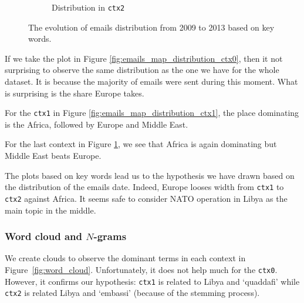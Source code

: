 \documentclass[11pt]{article}
\begin{document}
\begin{figure}[!t]
\begin{subfigure}[b]{0.3\linewidth}
		\caption[]%
		{{\small Distribution in \texttt{ctx2}}}
		\label{fig:emails_map_distribution_ctx2}
	\end{subfigure}
	\caption{The evolution of emails distribution from 2009 to 2013 based on key words.}
	\label{fig:map_distribution_evolution}
\end{figure}

If we take the plot in Figure \ref{fig:emails_map_distribution_ctx0}, then it not surprising to observe the same distribution as the one we have for the whole dataset. It is because the majority of emails were sent during this moment. What is surprising is the share Europe takes.

For the \texttt{ctx1} in Figure \ref{fig:emails_map_distribution_ctx1}, the place dominating is the Africa, followed by Europe and Middle East.

For the last context in Figure \ref{fig:emails_map_distribution_ctx2}, we see that Africa is again dominating but Middle East beats Europe.

The plots based on key words lead us to the hypothesis we have drawn based on the distribution of the emails date. Indeed, Europe looses width from \texttt{ctx1} to \texttt{ctx2} against Africa. It seems safe to consider NATO operation in Libya as the main topic in the middle.

\subsubsection{Word cloud and $N$-grams}

We create clouds to observe the dominant terms in each context in Figure~\ref{fig:word_cloud}. Unfortunately, it does not help much for the \texttt{ctx0}. However, it confirms our hypothesis: \texttt{ctx1} is related to Libya and `quaddafi' while \texttt{ctx2} is related Libya and `embassi' (because of the stemming process).
\end{document}
